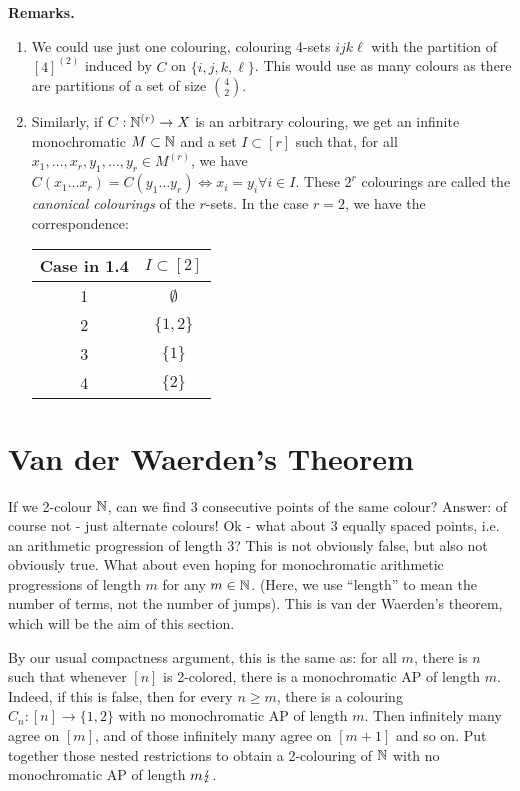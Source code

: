 \documentclass[10pt,a4paper]{article}
\begin{document}
\textbf{Remarks.}
\begin{enumerate}
  \item We could use just one colouring, colouring 4-sets $ijk\ell$ with the partition of $[4]^{(2)}$ induced by $C$ on $\{i,j,k,\ell\}$. This would use as many colours as there are partitions of a set of size $\binom{4}{2}$.
  \item Similarly, if $C:\mathbb{N}^{(r)} \to X$ is an arbitrary colouring, we get an infinite monochromatic $M \subset \mathbb{N}$ and a set $I \subset [r]$ such that, for all $x_1, \ldots, x_r, y_1,\ldots, y_r \in M^{(r)}$, we have $C(x_1\ldots x_r) = C(y_1\ldots y_r) \iff x_i = y_i \forall i \in I$. These $2^r$ colourings are called the \emph{canonical colourings} of the $r$-sets. In the case $r = 2$, we have the correspondence:
  \begin{center}
    \begin{tabular}{c|c}
      Case in \textbf{1.4} & $I \subset [2]$\\\hline
      1 & $\emptyset$\\
      2 & $\{1,2\}$\\
      3 & $\{1\}$\\
      4 & $\{2\}$
    \end{tabular}
  \end{center}
\end{enumerate}
\section{Van der Waerden's Theorem}
If we 2-colour $\mathbb{N}$, can we find 3 consecutive points of the same colour? Answer: of course not - just alternate colours! Ok - what about 3 equally spaced points, i.e. an arithmetic progression of length 3? This is not obviously false, but also not obviously true. What about even hoping for monochromatic arithmetic progressions of length $m$ for any $m \in \mathbb{N}$. (Here, we use ``length'' to mean the number of terms, not the number of jumps). This is van der Waerden's theorem, which will be the aim of this section.

By our usual compactness argument, this is the same as: for all $m$, there is $n$ such that whenever $[n]$ is 2-colored, there is a monochromatic AP of length $m$. Indeed, if this is false, then for every $n \geq m$, there is a colouring $C_n:[n]\to \{1,2\}$ with no monochromatic AP of length $m$. Then infinitely many agree on $[m]$, and of those infinitely many agree on $[m+1]$ and so on. Put together those nested restrictions to obtain a 2-colouring of $\mathbb{N}$ with no monochromatic AP of length $m \lightning$.
\end{document}
